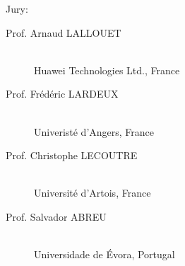 \begin{titlepage}
\begin{center}
\end{center}
\end{titlepage}
\restoregeometry
\sloppy\pagebreak


\begin{vcentrepage}
{ \begin{center}\Large {\sc Jury}:  \end{center}}
\vspace{1em}
\begin{description}
\item[Prof. Arnaud LALLOUET] \hfill \\
Huawei Technologies Ltd., France
\item[Prof. Frédéric LARDEUX] \hfill \\ %
Univeristé d'Angers, France
\item[Prof. Christophe LECOUTRE] \hfill \\ %
Université d'Artois, France
\item[Prof. Salvador ABREU] \hfill \\
Universidade de Évora, Portugal
\end{description}
\pagestyle{plain}


\end{vcentrepage}
